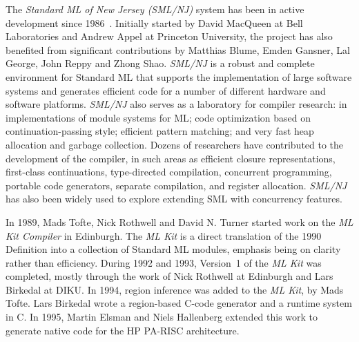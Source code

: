   The {\em Standard ML of New Jersey (SML/NJ)} system has been in active development
  since 1986~\cite{am87,am91}.
  Initially started by David MacQueen at Bell Laboratories and Andrew Appel at Princeton University, 
  the project has also benefited from significant contributions
  by Matthias Blume, Emden Gansner, Lal George, John Reppy and Zhong Shao.
  {\em SML/NJ} is a robust and complete environment for Standard ML that supports
  the implementation of large software systems and generates efficient code for a
  number of different hardware and software platforms.  {\em SML/NJ} also serves as
  a laboratory for compiler research: in implementations of module systems for ML;
  code optimization based on continuation-passing style; efficient pattern matching;
  and very fast heap allocation and garbage collection.  Dozens of researchers
  have contributed to the development of the compiler, in such areas as
  efficient closure representations, first-class continuations, type-directed
  compilation, concurrent programming, portable code generators, separate
  compilation, and register allocation.  
  {\em SML/NJ} has also been widely used to explore extending SML with
  concurrency features.



In 1989, Mads Tofte, Nick Rothwell and David N. Turner started work on the
{\em ML Kit Compiler} in Edinburgh. The {\em ML Kit} is a direct translation
of the 1990 Definition into a collection of Standard ML modules, emphasis being
on clarity rather than efficiency. During 1992 and 1993, Version~1 of the {\em
ML Kit} was completed, mostly through the work of Nick Rothwell at Edinburgh
and Lars Birkedal at DIKU\cite{BRTT}. In 1994, region inference was added to
the {\em ML Kit}, by Mads Tofte. Lars Birkedal wrote a region-based C-code
generator and a runtime system in C.  In 1995, Martin Elsman and Niels
Hallenberg extended this work to generate native code for the HP PA-RISC
architecture.

